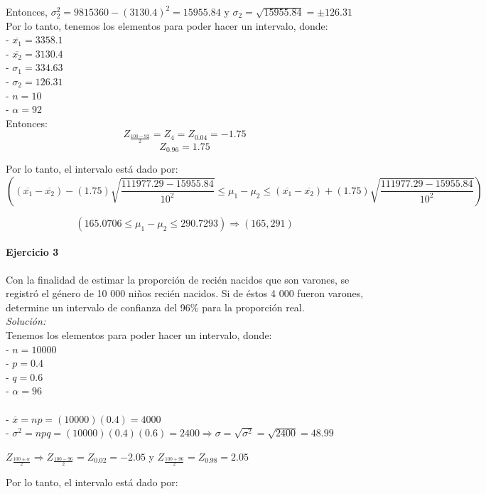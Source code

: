 \documentclass[12pt]{article}
\begin{document}
Entonces, $ \sigma_{2}^2 = 9815360 -(3130.4)^2 = 15955.84 $ y $\sigma_{2} = \sqrt{15955.84} = \pm 126.31 $ \\

Por lo tanto, tenemos los elementos para poder hacer un intervalo, donde: \\
- $ \overline{x_{1}} = 3358.1$ \\ 
- $ \overline{x_{2}} = 3130.4 $ \\
- $ \sigma_{1} = 334.63 $ \\ 
- $ \sigma_{2} = 126.31 $ \\ 
- $ n = 10 $ \\ 
- $  \alpha = 92$ \\

Entonces: 
$$ Z_{ \frac{100-92}{2} }  =  Z_{4} = Z_{0.04} = -1.75 $$  $$ Z_{0.96} = 1.75 $$

Por lo tanto, el intervalo está dado por: 
$$ \left( ( \overline{x_{1}} - \overline{x_{2}} ) - \left( 1.75 \right) \sqrt{\frac{111977.29-15955.84}{10^2}} \leq \mu_{1} - \mu_{2} \leq    (\overline{x_{1}} - \overline{x_{2}}) + \left( 1.75 \right) \sqrt{\frac{111977.29-15955.84}{10^2}}         \right)  $$

$$(165.0706 \leq \mu_{1} - \mu_{2} \leq 290.7293) \Rightarrow (165,291)  $$ 

\paragraph{Ejercicio 3}
Con la finalidad de estimar la proporción de recién nacidos que son varones, se registró el género de 10 000 niños recién nacidos. Si de éstos 4 000 fueron varones, determine un intervalo de confianza del 96\% para la proporción real. \\

\textit{Solución: } \\
Tenemos los elementos para poder hacer un intervalo, donde: \\
- $ n = 10000 $ \\
- $ p = 0.4 $ \\ 
- $ q = 0.6 $ \\ 
- $ \alpha = 96 $ \\ \\
- $ \overline{x} = np = (10000)(0.4) = 4000 $ \\
- $ \sigma^2 = npq = (10000)(0.4)(0.6) = 2400  \Rightarrow \sigma = \sqrt{\sigma^2} = \sqrt{2400} = 48.99 $ \\

\begin{center}
$ Z_{\frac{100 \pm \alpha}{2}} \Rightarrow  Z_{\frac{100-96}{2}} = Z_{0.02} = -2.05 $ y $ Z_{\frac{100+96}{2}} = Z_{0.98} = 2.05  $ 
\end{center}
Por lo tanto, el intervalo está dado por: 
\end{document}
